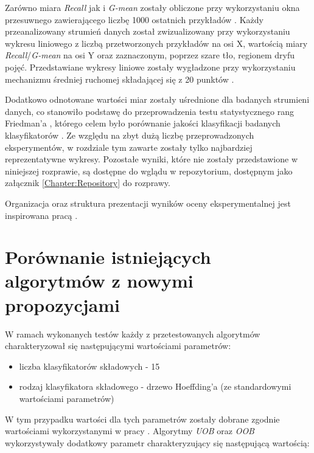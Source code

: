 Zarówno miara \textit{Recall} jak i \textit{G-mean} zostały obliczone przy wykorzystaniu okna przesuwnego zawierającego liczbę 1000 ostatnich przykładów \cite{Article:Evaluation}. Każdy przeanalizowany strumień danych został zwizualizowany przy wykorzystaniu wykresu liniowego z liczbą przetworzonych przykładów na osi X, wartością miary \textit{Recall}/\textit{G-mean} na osi Y oraz zaznaczonym, poprzez szare tło, regionem dryfu pojęć. Przedstawiane wykresy liniowe zostały wygładzone przy wykorzystaniu mechanizmu średniej ruchomej składającej się z 20 punktów \cite{Article:TypyPrzykladow}.

Dodatkowo odnotowane wartości miar zostały uśrednione dla badanych strumieni danych, co stanowiło podstawę do przeprowadzenia testu statystycznego rang Friedman'a \cite{Article:Friedman}, którego celem było porównanie jakości klasyfikacji badanych klasyfikatorów \cite{Article:TypyPrzykladow}. Ze względu na zbyt dużą liczbę przeprowadzonych eksperymentów, w rozdziale tym zawarte zostały tylko najbardziej reprezentatywne wykresy. Pozostałe wyniki, które nie zostały przedstawione w niniejszej rozprawie, są dostępne do wglądu w repozytorium, dostępnym jako załącznik \ref{Chapter:Repository} do rozprawy.

Organizacja oraz struktura prezentacji wyników oceny eksperymentalnej jest inspirowana pracą \cite{Article:TypyPrzykladow}.

\section{Porównanie istniejących algorytmów z nowymi propozycjami}
\label{Section:AlgorithmsComparison}

\noindent W ramach wykonanych testów każdy z przetestowanych algorytmów charakteryzował się następującymi wartościami parametrów:

\begin{itemize}
    \item liczba klasyfikatorów składowych - 15
    \item rodzaj klasyfikatora składowego - drzewo Hoeffding'a (ze standardowymi wartościami parametrów)
\end{itemize}

\noindent W tym przypadku wartości dla tych parametrów zostały dobrane zgodnie wartościami wykorzystanymi w pracy \cite{Article:TypyPrzykladow}. Algorytmy \textit{UOB} oraz \textit{OOB} wykorzystywały dodatkowy parametr charakteryzujący się następującą wartością:

